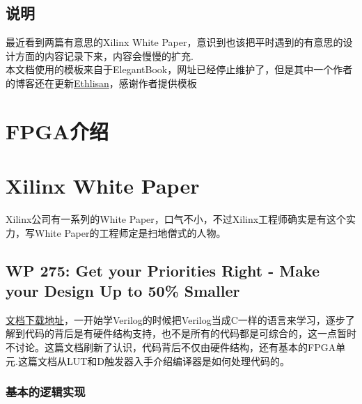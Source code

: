 \documentclass[color=green,mathpazo,titlestyle=hang,11pt]{elegantbook}
\author{Yu Wang}
\begin{document}
\maketitle
\tableofcontents
\mainmatter
\chapter*{说明}
最近看到两篇有意思的Xilinx White Paper，意识到也该把平时遇到的有意思的设计方面的内容记录下来，内容会慢慢的扩充.\\
本文档使用的模板来自于ElegantBook，网址已经停止维护了，但是其中一个作者的博客还在更新\href{http://ddswhu.com/}{Ethlisan}，感谢作者提供模板
\part{FPGA介绍}

\part{Xilinx White Paper}
Xilinx公司有一系列的White Paper，口气不小，不过Xilinx工程师确实是有这个实力，写White Paper的工程师定是扫地僧式的人物。
\chapter{WP 275: Get your Priorities Right - Make your Design Up to 50\% Smaller}
\href{https://www.xilinx.com/support/documentation/white_papers/wp275.pdf}{文档下载地址}，一开始学Verilog的时候把Verilog当成C一样的语言来学习，逐步了解到代码的背后是有硬件结构支持，也不是所有的代码都是可综合的，这一点暂时不讨论。这篇文档刷新了认识，代码背后不仅由硬件结构，还有基本的FPGA单元.这篇文档从LUT和D触发器入手介绍编译器是如何处理代码的。
\section{基本的逻辑实现}
\end{document}
